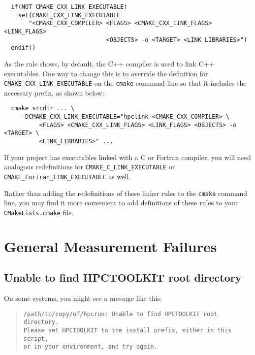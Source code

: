 \documentclass[11pt,twoside,letterpaper]{report}
\begin{document}
\begin{verbatim}
  if(NOT CMAKE_CXX_LINK_EXECUTABLE)
    set(CMAKE_CXX_LINK_EXECUTABLE
       "<CMAKE_CXX_COMPILER> <FLAGS> <CMAKE_CXX_LINK_FLAGS> <LINK_FLAGS>
                             <OBJECTS> -o <TARGET> <LINK_LIBRARIES>")
  endif()
\end{verbatim}

\noindent
As the rule shows, by default, the C++ compiler is used to link C++ executables. One way to change this is to override the definition for \verb|CMAKE_CXX_LINK_EXECUTABLE|  on the {\tt cmake} command line so that it includes the  necessary \hpclink{} prefix, as shown below:

\begin{verbatim}
  cmake srcdir ... \
     -DCMAKE_CXX_LINK_EXECUTABLE="hpclink <CMAKE_CXX_COMPILER> \
          <FLAGS> <CMAKE_CXX_LINK_FLAGS> <LINK_FLAGS> <OBJECTS> -o <TARGET> \
          <LINK_LIBRARIES>" ...
\end{verbatim}

\noindent
If your project has executables linked with a C or Fortran compiler, you will need analogous redefinitions for \verb|CMAKE_C_LINK_EXECUTABLE| or  \verb|CMAKE_Fortran_LINK_EXECUTABLE| as well.

Rather than adding the redefinitions of these linker rules to the {\tt cmake} command line,
you may find it more convenient to add definitions of these rules to your {\tt CMakeLists.cmake} file.


\section{General Measurement Failures}


\subsection{Unable to find HPCTOOLKIT root directory}

On some systems, you might see a message like this:
\begin{quote}
\begin{verbatim}
/path/to/copy/of/hpcrun: Unable to find HPCTOOLKIT root directory.
Please set HPCTOOLKIT to the install prefix, either in this script,
or in your environment, and try again.
\end{verbatim}
\end{quote}
\end{document}

